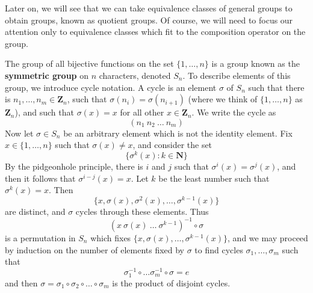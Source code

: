 Later on, we will see that we can take equivalence classes of general groups to obtain groups, known as quotient groups. Of course, we will need to focus our attention only to equivalence classes which fit to the composition operator on the group.

\begin{example}
    The group of all bijective functions on the set $\{ 1, \dots, n \}$ is a group known as the {\bf symmetric group} on $n$ characters, denoted $S_n$. To describe elements of this group, we introduce cycle notation. A cycle is an element $\sigma$ of $S_n$ such that there is $n_1, \dots, n_m \in \mathbf{Z}_n$, such that $\sigma(n_i) = \sigma(n_{i+1})$ (where we think of $\{ 1, \dots, n \}$ as $\mathbf{Z}_n$), and such that $\sigma(x) = x$ for all other $x \in \mathbf{Z}_n$. We write the cycle as
    \[ (n_1\ n_2\ \dots\ n_m) \]
    Now let $\sigma \in S_n$ be an arbitrary element which is not the identity element. Fix $x \in \{ 1, \dots, n \}$ such that $\sigma(x) \neq x$, and consider the set
    \[ \{ \sigma^k(x) : k \in \mathbf{N} \} \]
    By the pidgeonhole principle, there is $i$ and $j$ such that $\sigma^i(x) = \sigma^j(x)$, and then it follows that $\sigma^{i-j}(x) = x$. Let $k$ be the least number such that $\sigma^k(x) = x$. Then
    \[ \{ x, \sigma(x), \sigma^2(x), \dots, \sigma^{k-1}(x) \} \]
    are distinct, and $\sigma$ cycles through these elements. Thus
    \[ (x\ \sigma(x)\ \dots\ \sigma^{k-1})^{-1} \circ \sigma \]
    is a permutation in $S_n$ which fixes $\{ x, \sigma(x), \dots, \sigma^{k-1}(x) \}$, and we may proceed by induction on the number of elements fixed by $\sigma$ to find cycles $\sigma_1, \dots, \sigma_m$ such that
    \[ \sigma_1^{-1} \circ \dots \sigma_m^{-1} \circ \sigma = e \]
    and then $\sigma = \sigma_1 \circ \sigma_2 \circ \dots \circ \sigma_m$ is the product of disjoint cycles.
\end{example}

